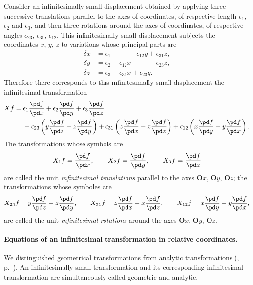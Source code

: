 {\small
Consider an infinitesimally small displacement obtained by applying three successive translations parallel to the axes of coordinates, of respective length $\epsilon_{1}$, $\epsilon_{2}$ and $\epsilon_{3}$, and then three rotations around the axes of coordinates, of respective angles $\epsilon_{23}$, $\epsilon_{31}$, $\epsilon_{12}$. This infinitesimally small displacement subjects the coordinates $x$, $y$, $z$ to variations whose principal parts are
\begin{align*}
  \delta x&=\epsilon_{1}{}\phantom{+\epsilon_{12}x}{}-\epsilon_{12}y+\epsilon_{31}z,\\
  \delta y&=\epsilon_{2}+\epsilon_{12}x\phantom{+\epsilon_{12}y}-\epsilon_{23}z,\\
  \delta z&=\epsilon_{3}-\epsilon_{31}x+\epsilon_{23}y.
\end{align*}
Therefore there corresponds to this infinitesimally small displacement the infinitesimal transformation
\begin{align*}
  Xf={}&{}\epsilon_{1}\frac{\pd f}{\pd x}+\epsilon_{2}\frac{\pd f}{\pd y}+\epsilon_{3}\frac{\pd f}{\pd z}\\
  &{}+\epsilon_{23}\left(y\frac{\pd f}{\pd z}-z\frac{\pd f}{\pd y}\right)
  +\epsilon_{31}\left(z\frac{\pd f}{\pd x}-x\frac{\pd f}{\pd z}\right)
  +\epsilon_{12}\left(x\frac{\pd f}{\pd y}-y\frac{\pd f}{\pd x}\right).
\end{align*}
The transformations whose symbols are
\[
X_{1}f=\frac{\pd f}{\pd x},\qquad X_{2}f=\frac{\pd f}{\pd y},\qquad X_{3}f=\frac{\pd f}{\pd z}
\]
are called the unit \emph{infinitesimal translations} parallel to the axes $\mathbf{O}x$, $\mathbf{O}y$, $\mathbf{O}z$; the transformations whose symboles are
\[
X_{23}f=y\frac{\pd f}{\pd z}-z\frac{\pd f}{\pd y},\qquad
X_{31}f=z\frac{\pd f}{\pd x}-x\frac{\pd f}{\pd z},\qquad
X_{12}f=x\frac{\pd f}{\pd y}-y\frac{\pd f}{\pd x},
\] 
}
are called the unit \emph{infinitesimal rotations} around the axes $\mathbf{O}x$, $\mathbf{O}y$, $\mathbf{O}z$.

\paragraph{Equations of an infinitesimal transformation in relative coordinates.}
\label{sec:69}
We distinguished geometrical transformations from analytic transformations (, p.~\pageref{sec:62}). An infinitesimally small transformation and its corresponding infinitesimal transformation are simultaneously called geometric and analytic.

